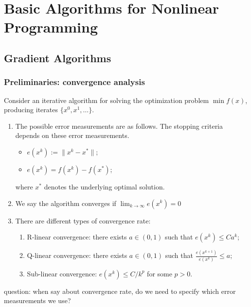 \chapter{Basic Algorithms for Nonlinear Programming}

\section{Gradient Algorithms}
\subsection{Preliminaries: convergence analysis}
Consider an iterative algorithm for solving the optimization problem $\min f(x)$, producing iterates $\{x^0,x^1,\dots\}$.
\begin{enumerate}
\item
The possible error measurements are as follows. The stopping criteria depends on these error measurements.
\begin{itemize}
\item
$e(x^k):=\|x^k-x^*\|$;
\item
$e(x^k) = f(x^k) - f(x^*)$;
\end{itemize}
where $x^*$ denotes the underlying optimal solution.
\item
We say the algorithm converges if $\lim_{k\to\infty}e(x^k) = 0$
\item
There are different types of convergence rate:
\begin{enumerate}
\item
R-linear convergence: there exists $a\in(0,1)$ such that $e(x^k)\le Ca^k$;
\item
Q-linear convergence: there exists $a\in(0,1)$ such that $\frac{e(x^{k+1})}{e(x^k)}\le a$;
\item
Sub-linear convergence: $e(x^k)\le C/k^p$ for some $p>0$.
\end{enumerate}
\end{enumerate}
question: when say about convergence rate, do we need to specify which error measurements we use?
